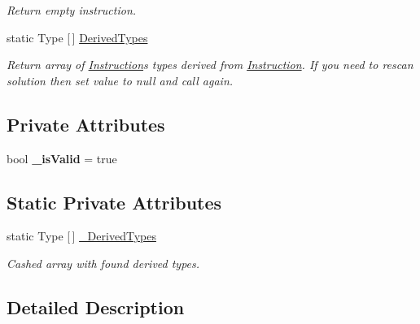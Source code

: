 \begin{DoxyCompactItemize}
\begin{DoxyCompactList}\small\item\em Return empty instruction. \end{DoxyCompactList}\item 
static Type \mbox{[}$\,$\mbox{]} \mbox{\hyperlink{class_pipes_provider_1_1_networking_1_1_routing_1_1_instruction_afe25e78581cc3344b90a710f73a2d1be}{Derived\+Types}}
\begin{DoxyCompactList}\small\item\em Return array of \mbox{\hyperlink{class_pipes_provider_1_1_networking_1_1_routing_1_1_instruction}{Instruction}}\textquotesingle{}s types derived from \mbox{\hyperlink{class_pipes_provider_1_1_networking_1_1_routing_1_1_instruction}{Instruction}}. If you need to rescan solution then set value to null and call again. \end{DoxyCompactList}\end{DoxyCompactItemize}
\subsection*{Private Attributes}
\begin{DoxyCompactItemize}
\item 
\mbox{\label{class_pipes_provider_1_1_networking_1_1_routing_1_1_instruction_abcd8b85ff0383ecd73b24befa9d69506}} 
bool {\bfseries \+\_\+is\+Valid} = true
\end{DoxyCompactItemize}
\subsection*{Static Private Attributes}
\begin{DoxyCompactItemize}
\item 
static Type \mbox{[}$\,$\mbox{]} \mbox{\hyperlink{class_pipes_provider_1_1_networking_1_1_routing_1_1_instruction_af4402de9adb2ac8dc18bbda83465b749}{\+\_\+\+Derived\+Types}}
\begin{DoxyCompactList}\small\item\em Cashed array with found derived types. \end{DoxyCompactList}\end{DoxyCompactItemize}


\subsection{Detailed Description}


